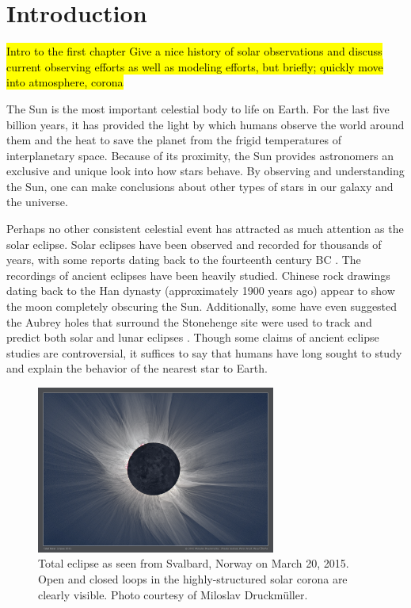 \chapter{Introduction}
\label{ch:intro}
\hl{Intro to the first chapter
Give a nice history of solar observations and discuss current observing efforts as well as modeling efforts, but briefly; quickly move into atmosphere, corona}
\par The Sun is the most important celestial body to life on Earth. For the last five billion years, it has provided the light by which humans observe the world around them and the heat to save the planet from the frigid temperatures of interplanetary space. Because of its proximity, the Sun provides astronomers an exclusive and unique look into how stars behave. By observing and understanding the Sun, one can make conclusions about other types of stars in our galaxy and the universe.
%
\par Perhaps no other consistent celestial event has attracted as much attention as the solar eclipse. Solar eclipses have been observed and recorded for thousands of years, with some reports dating back to the fourteenth century BC \citep{golub_solar_2010}. The recordings of ancient eclipses have been heavily studied. Chinese rock drawings dating back to the Han dynasty (approximately 1900 years ago) appear to show the moon completely obscuring the Sun. Additionally, some have even suggested the Aubrey holes that surround the Stonehenge site were used to track and predict both solar and lunar eclipses \citep{golub_solar_2010}. Though some claims of ancient eclipse studies are controversial, it suffices to say that humans have long sought to study and explain the behavior of the nearest star to Earth.
%
\begin{figure}
	\centering
	\includegraphics[width=0.7\textwidth]{figures/Tse_2015_Svalbard_800mm_Nikon_D810.png}
	\caption{Total eclipse as seen from Svalbard, Norway on March 20, 2015. Open and closed loops in the highly-structured solar corona are clearly visible. Photo courtesy of Miloslav Druckm\"{u}ller.}
	\label{fig:solar_eclipse}
\end{figure}
